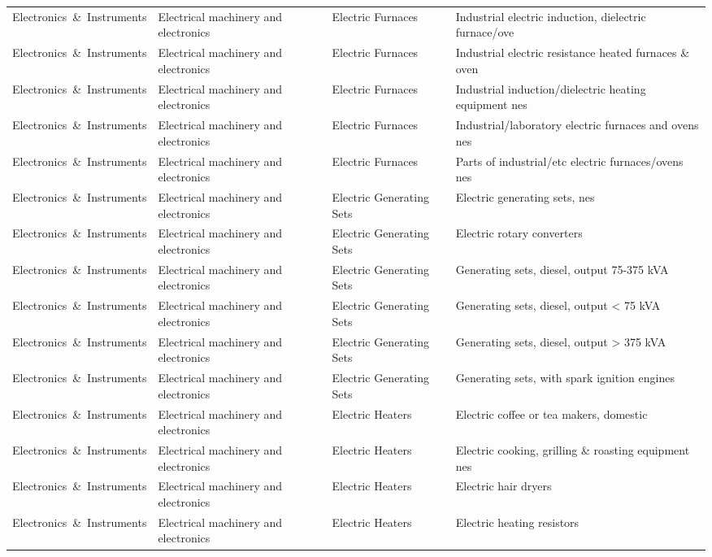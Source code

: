 \begin{appendices}
\begin{xltabular}{\textwidth}{|p{0.14\textwidth}|p{0.28\textwidth}|p{0.18\textwidth}|p{0.30\textwidth}|}
Electronics\ \&\ Instruments & Electrical machinery and electronics & Electric Furnaces & Industrial electric induction, dielectric furnace/ove \\
Electronics\ \&\ Instruments & Electrical machinery and electronics & Electric Furnaces & Industrial electric resistance heated furnaces \& oven \\
Electronics\ \&\ Instruments & Electrical machinery and electronics & Electric Furnaces & Industrial induction/dielectric heating equipment nes \\
Electronics\ \&\ Instruments & Electrical machinery and electronics & Electric Furnaces & Industrial/laboratory electric furnaces and ovens nes \\
Electronics\ \&\ Instruments & Electrical machinery and electronics & Electric Furnaces & Parts of industrial/etc electric furnaces/ovens nes \\
Electronics\ \&\ Instruments & Electrical machinery and electronics & Electric Generating Sets & Electric generating sets, nes \\
Electronics\ \&\ Instruments & Electrical machinery and electronics & Electric Generating Sets & Electric rotary converters \\
Electronics\ \&\ Instruments & Electrical machinery and electronics & Electric Generating Sets & Generating sets, diesel, output 75-375 kVA \\
Electronics\ \&\ Instruments & Electrical machinery and electronics & Electric Generating Sets & Generating sets, diesel, output < 75 kVA \\
Electronics\ \&\ Instruments & Electrical machinery and electronics & Electric Generating Sets & Generating sets, diesel, output > 375 kVA \\
Electronics\ \&\ Instruments & Electrical machinery and electronics & Electric Generating Sets & Generating sets, with spark ignition engines \\
Electronics\ \&\ Instruments & Electrical machinery and electronics & Electric Heaters & Electric coffee or tea makers, domestic \\
Electronics\ \&\ Instruments & Electrical machinery and electronics & Electric Heaters & Electric cooking, grilling \& roasting equipment nes \\
Electronics\ \&\ Instruments & Electrical machinery and electronics & Electric Heaters & Electric hair dryers \\
Electronics\ \&\ Instruments & Electrical machinery and electronics & Electric Heaters & Electric heating resistors \\

\end{xltabular}
\end{appendices}
